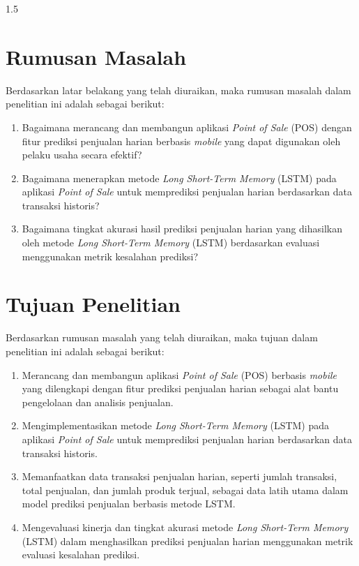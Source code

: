 \documentclass[12pt, a4paper, onecolumn, oneside]{report}
\begin{document}
\begin{spacing}{1.5}
\section{Rumusan Masalah}
Berdasarkan latar belakang yang telah diuraikan, maka rumusan masalah dalam penelitian ini adalah sebagai berikut:
\begin{enumerate}
    \item Bagaimana merancang dan membangun aplikasi \textit{Point of Sale} (POS) dengan fitur prediksi penjualan harian berbasis \textit{mobile} yang dapat digunakan oleh pelaku usaha secara efektif?
    \item Bagaimana menerapkan metode \textit{Long Short-Term Memory} (LSTM) pada aplikasi \textit{Point of Sale} untuk memprediksi penjualan harian berdasarkan data transaksi historis?
    \item Bagaimana tingkat akurasi hasil prediksi penjualan harian yang dihasilkan oleh metode \textit{Long Short-Term Memory} (LSTM) berdasarkan evaluasi menggunakan metrik kesalahan prediksi?
\end{enumerate}

\section{Tujuan Penelitian}
Berdasarkan rumusan masalah yang telah diuraikan, maka tujuan dalam penelitian ini adalah sebagai berikut:
\begin{enumerate}
    \item Merancang dan membangun aplikasi \textit{Point of Sale} (POS) berbasis \textit{mobile} yang dilengkapi dengan fitur prediksi penjualan harian sebagai alat bantu pengelolaan dan analisis penjualan.
    \item Mengimplementasikan metode \textit{Long Short-Term Memory} (LSTM) pada aplikasi \textit{Point of Sale} untuk memprediksi penjualan harian berdasarkan data transaksi historis.
    \item Memanfaatkan data transaksi penjualan harian, seperti jumlah transaksi, total penjualan, dan jumlah produk terjual, sebagai data latih utama dalam model prediksi penjualan berbasis metode LSTM.
    \item Mengevaluasi kinerja dan tingkat akurasi metode \textit{Long Short-Term Memory} (LSTM) dalam menghasilkan prediksi penjualan harian menggunakan metrik evaluasi kesalahan prediksi.
\end{enumerate}


\end{spacing}
\end{document}
